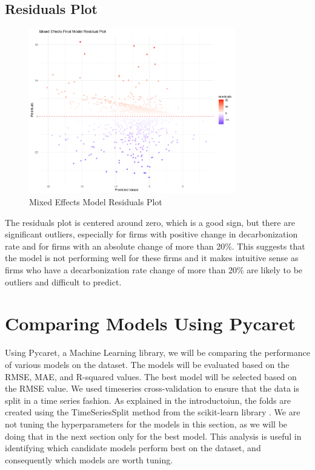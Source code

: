 \subsection{Residuals Plot}
\begin{figure}[H]
    \centering
    \includegraphics[width=0.8\textwidth]{figures/final_model_residuals.png}
    \caption{Mixed Effects Model Residuals Plot}
    \label{fig:mixed_effects_residuals}
\end{figure}
\noindent The residuals plot is centered around zero, which is a good sign, but there are significant outliers, especially for firms with positive change in decarbonization rate and for firms with an absolute change of more than 20\%. This suggests that the model is not performing well for these firms and it makes intuitive sense as firms who have a decarbonization rate change of more than 20\% are likely to be outliers and difficult to predict.

\section{Comparing Models Using Pycaret}
Using Pycaret, a Machine Learning library, we will be comparing the performance of various models on the dataset. The models will be evaluated based on the RMSE, MAE, and R-squared values. The best model will be selected based on the RMSE value. We used timeseries cross-validation to ensure that the data is split in a time series fashion. As explained in the introductoiun, the folds are created using the TimeSeriesSplit method from the scikit-learn library \cite{scikit-learn}. We are not tuning the hyperparameters for the models in this section, as we will be doing that in the next section only for the best model. This analysis is useful in identifying which candidate models perform best on the dataset, and consequently which models are worth tuning.

